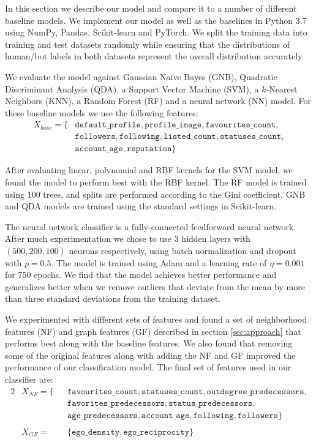 In this section we describe our model and compare it to a number of different baseline models. We implement our model as well as the baselines in Python 3.7 using NumPy, Pandas, Scikit-learn and PyTorch. We split the training data into training and test datasets randomly while ensuring that the distributions of human/bot labels in both datasets represent the overall distribution accurately.

We evaluate the model against Gaussian Naïve Bayes (GNB), Quadratic Discriminant Analysis (QDA), a Support Vector Machine (SVM), a $k$-Nearest Neighbors (KNN), a Random Forest (RF) and a neural network (NN) model. For these baseline models we use the following features:
\begin{align*}
    X_{base} = \{ & \texttt{default\_profile}, \texttt{profile\_image}, \texttt{favourites\_count}, \\
    & \texttt{followers}, \texttt{following}, \texttt{listed\_count}, \texttt{statuses\_count}, \\
    & \texttt{account\_age}, \texttt{reputation} \}
\end{align*}

After evaluating linear, polynomial and RBF kernels for the SVM model, we found the model to perform best with the RBF kernel. The RF model is trained using 100 trees, and splits are performed according to the Gini coefficient. GNB and QDA models are trained using the standard settings in Scikit-learn. 

The neural network classifier is a fully-connected feedforward neural network. After much experimentation we chose to use 3 hidden layers with $(500, 200, 100)$ neurons respectively, using batch normalization and dropout with $p=0.5$. The model is trained using Adam and a learning rate of $\eta = 0.001$ for 750 epochs. We find that the model achieves better performance and generalizes better when we remove outliers that deviate from the mean by more than three standard deviations from the training dataset.

We experimented with different sets of features and found a set of neighborhood features (NF) and graph features (GF) described in section \ref{sec:approach} that performs best along with the baseline features. We also found that removing some of the original features along with adding the  NF and GF improved the performance of our classification model. The final set of features used in our classifier are:
\begin{alignat*}{2}
    & X_{NF} = \{ && \texttt{favourites\_count}, \texttt{statuses\_count}, \texttt{outdegree\_predecessors}, \\
    & && \texttt{favorites\_predecessors}, \texttt{status\_predecessors}, \\
    & && \texttt{age\_predecessors}, \texttt{account\_age}, \texttt{following}, \texttt{followers} \} \\
    \\
    & X_{GF} = && \{ \texttt{ego\_density}, \texttt{ego\_reciprocity} \}
\end{alignat*}

